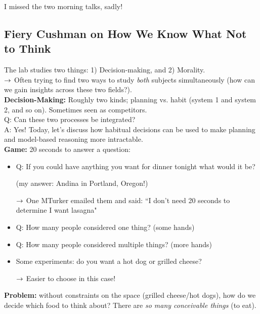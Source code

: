 I missed the two morning talks, sadly!

\subsection{Fiery Cushman on How We Know What Not to Think}
\label{sec:fc}

The lab studies two things: 1) Decision-making, and 2) Morality. \\

$\rightarrow$ Often trying to find two ways to study {\it both} subjects simultaneously (how can we gain insights across these two fields?). \\

{\bf Decision-Making:} Roughly two kinds; planning vs. habit (system 1 and system 2, and so on). Sometimes seen as competitors. \\

Q: Can these two processes be integrated? \\

A: Yes! Today, let's discuss how habitual decisions can be used to make planning and model-based reasoning more intractable. \\

{\bf Game:} 20 seconds to answer a question:
\begin{itemize}
    \item Q: If you could have anything you want for dinner tonight what would it be?
    
    (my answer: Andina in Portland, Oregon!)
    
    $\rightarrow$ One MTurker emailed them and said: ``I don't need 20 seconds to determine I want lasagna"
    
    \item Q: How many people considered one thing? (some hands)
    \item Q: How many people considered multiple things? (more hands)
    \item Some experiments: do you want a hot dog or grilled cheese?
    
    $\rightarrow$ Easier to choose in this case!
\end{itemize}


{\bf Problem:} without constraints on the space (grilled cheese/hot dogs), how do we decide which food to think about? There are {\it so many conceivable things} (to eat). \\


